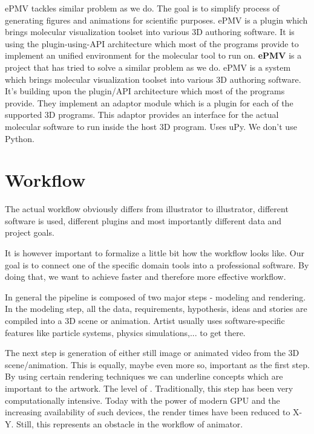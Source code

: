 \documentclass[
  digital, %
  table,   %
  nolof,     %
  nolot,     %
]{fithesis3}
\begin{document}
ePMV tackles similar problem as we do. The goal is to simplify process of generating figures and animations for scientific purposes. ePMV is a plugin which brings molecular visualization toolset into various 3D authoring software. It is using the plugin-using-API architecture which most of the programs provide to implement an unified environment for the molecular tool to run on. 
\textbf{ePMV}\cite{ePMV} is a project that has tried to solve a similar problem as we do. ePMV is a system which brings molecular visualization toolset into various 3D authoring software. It's building upon the plugin/API architecture which most of the programs provide. They implement an adaptor module which is a plugin for each of the supported 3D programs. This adaptor provides an interface for the actual molecular software to run inside the host 3D program. Uses uPy. We don't use Python.

\section{Workflow}
The actual workflow obviously differs from illustrator to illustrator, different software is used, different plugins and most importantly different data and project goals.

It is however important to formalize a little bit how the workflow looks like. Our goal is to connect one of the specific domain tools into a professional software. By doing that, we want to achieve faster and therefore more effective workflow.

In general the pipeline is composed of two major steps - modeling and rendering. In the modeling step, all the data, requirements, hypothesis, ideas and stories are compiled into a 3D scene or animation. Artist usually uses software-specific features like particle systems, physics simulations,... to get there.

The next step is generation of either still image or animated video from the 3D scene/animation. This is equally, maybe even more so, important as the first step. By using certain rendering techniques we can underline concepts which are important to the artwork. The level of . Traditionally, this step has been very computationally intensive. Today with the power of modern GPU and the increasing availability of such devices, the render times have been reduced to X-Y. Still, this represents an obstacle in the workflow of animator.
\end{document}
